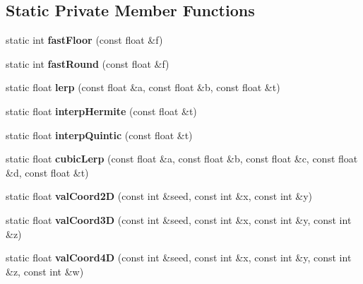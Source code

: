 \subsection*{Static Private Member Functions}
\begin{DoxyCompactItemize}
\item 
\mbox{\label{classnoisefast_a0739f6628d80691de07ec99a93140b35}} 
static int {\bfseries fast\+Floor} (const float \&f)
\item 
\mbox{\label{classnoisefast_a447687c0bc94876095c282cc44da9e4f}} 
static int {\bfseries fast\+Round} (const float \&f)
\item 
\mbox{\label{classnoisefast_aa179c89a996a558cfc3603b2ab1885e5}} 
static float {\bfseries lerp} (const float \&a, const float \&b, const float \&t)
\item 
\mbox{\label{classnoisefast_ac289346ffcbe9b2ec3fc4a801c5a4a91}} 
static float {\bfseries interp\+Hermite} (const float \&t)
\item 
\mbox{\label{classnoisefast_a07378201fdeb4e921640a56c376441b9}} 
static float {\bfseries interp\+Quintic} (const float \&t)
\item 
\mbox{\label{classnoisefast_ab7d5e034a1739f0c60e2a663e0616bd7}} 
static float {\bfseries cubic\+Lerp} (const float \&a, const float \&b, const float \&c, const float \&d, const float \&t)
\item 
\mbox{\label{classnoisefast_aff1b1c684c98751b185059eda692af99}} 
static float {\bfseries val\+Coord2D} (const int \&seed, const int \&x, const int \&y)
\item 
\mbox{\label{classnoisefast_ab402f456c5f6b7f61def1b80ade74bca}} 
static float {\bfseries val\+Coord3D} (const int \&seed, const int \&x, const int \&y, const int \&z)
\item 
\mbox{\label{classnoisefast_abe550a4c6ef485d44705adea60041c39}} 
static float {\bfseries val\+Coord4D} (const int \&seed, const int \&x, const int \&y, const int \&z, const int \&w)
\end{DoxyCompactItemize}
